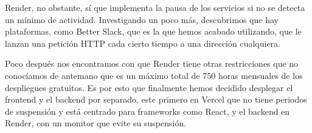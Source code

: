 Render, no obstante, sí que implementa la pausa de los servicios si no se detecta un mínimo de actividad. Investigando un poco más, descubrimos que hay plataformas, como Better Slack, que es la que hemos acabado utilizando, que le lanzan una petición HTTP cada cierto tiempo a una dirección cualquiera. 

Poco después nos encontramos con que Render tiene otras restricciones que no conocíamos de antemano que es un máximo total de 750 horas mensuales de los despliegues gratuitos. Es por esto que finalmente hemos decidido desplegar el frontend y el backend por separado, este primero en Vercel que no tiene periodos de suspensión y está centrado para frameworks como React, y el backend en Render, con un monitor que evite su suspensión.